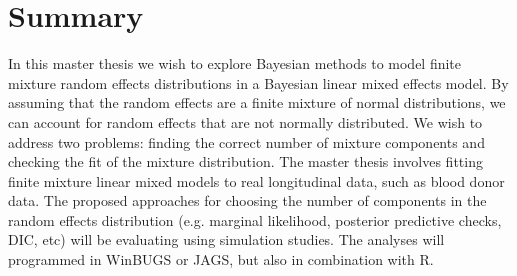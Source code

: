 
\chapter{Summary}
\label{ch : summary}


In this master thesis we wish to explore Bayesian methods to model finite mixture random effects distributions in a Bayesian linear mixed effects model. By assuming that the random effects are a finite mixture of normal distributions, we can account for random effects that are not normally distributed. We wish to address two problems: finding the correct number of mixture components and checking the fit of the mixture distribution. The master thesis involves fitting finite mixture linear mixed models to real longitudinal data, such as blood donor data. The proposed approaches for choosing the number of components in the random effects distribution (e.g. marginal likelihood, posterior predictive checks, DIC, etc) will be evaluating using simulation studies. The analyses will programmed in WinBUGS or JAGS, but also in combination with R.